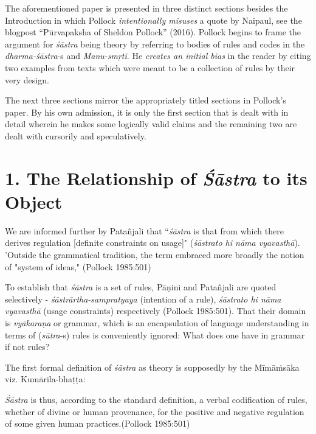 The aforementioned paper is presented in three distinct sections besides the Introduction in which Pollock {\sl intentionally misuses} a quote by Naipaul, see the blogpost ``Pūrvapaksha of Sheldon Pollock'' (2016). Pollock begins to frame the argument for {\sl śāstra} being theory by referring to bodies of rules and codes in the {\sl dharma-śāstra}-s and {\sl Manu-smṛti}. He {\sl creates an initial bias} in the reader by citing two examples from texts which were meant to be a collection of rules by their very design.

The next three sections mirror the appropriately titled sections in Pollock's paper. By his own admission, it is only the first section that is dealt with in detail wherein he makes some logically valid claims and the remaining two are dealt with cursorily and speculatively.

\section*{1. The Relationship of {{\sl\bfseries Śāstra}\relax} to its Object}

We are informed further by Patañjali that  ``{\sl śāstra} is that from which there derives regulation [definite constraints on usage]" ({\sl śāstrato hi nāma vyavasthā}). 'Outside the grammatical tradition, the term embraced more broadly the notion of "system of ideas," (Pollock 1985:501)

To establish that {\sl śāstra} is a set of rules, Pāṇini and Patañjali are quoted selectively - {\sl śāstrārtha-sampratyaya} (intention of a rule), {\sl śāstrato hi nāma vyavasthā} (usage constraints) respectively (Pollock 1985:501). That their domain is {\sl vyākaraṇa} or grammar, which is an encapsulation of language understanding in terms of ({\sl sūtra}-s) rules is conveniently ignored: What does one have in grammar if not rules? 

The first formal definition of {\sl śāstra} as theory is supposedly by the Mīmāṁsāka viz. Kumārila-bhaṭṭa:

\begin{myquote}
{{\sl Śāstra}} is thus, according to the standard definition, a verbal codification of rules, whether of divine or human provenance, for the positive and negative regulation of some given human practices.\hfill (Pollock 1985:501)
\end{myquote}

